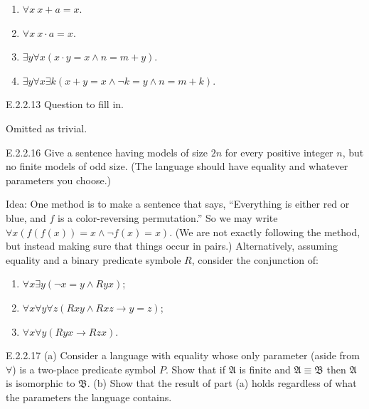 \begin{enumerate}
  \item $\forall x\ x+a=x$.
  \item $\forall x\ x\cdot a=x$.
  \item $\exists y\forall x(x\cdot y=x\wedge n=m+y)$.
  \item $\exists y\forall x\exists k(x+y=x\wedge \neg k=y\wedge n=m+k)$.
\end{enumerate}


\setcounter{exercise}{12}

\begin{exercise}{E.2.2.13}
  Question to fill in.
\end{exercise}

Omitted as trivial.

\setcounter{exercise}{15}

\begin{exercise}{E.2.2.16}
  Give a sentence having models of size $2n$ for every positive integer $n$, but no finite models of odd size. (The language should have equality and whatever parameters you choose.)
\end{exercise}

Idea: One method is to make a sentence that says, “Everything is either red or blue, and $f$ is a color-reversing permutation.” So we may write $\forall x(f(f(x))=x\wedge\neg f(x)=x)$. (We are not exactly following the method, but instead making sure that things occur in pairs.) Alternatively, assuming equality and a binary predicate symbole $R$, consider the conjunction of:
\begin{enumerate}[label=(\alph*)]
  \item $\forall x\exists y(\neg x=y\wedge Ryx)$;
  \item $\forall x\forall y\forall z(Rxy\wedge Rxz\to y=z)$;
  \item $\forall x\forall y(Ryx\to Rzx)$.
\end{enumerate}

\begin{exercise}{E.2.2.17}
  (a) Consider a language with equality whose only parameter (aside from $\forall$) is a two-place predicate symbol $P$. Show that if $\mathfrak{A}$ is finite and $\mathfrak{A}\equiv \mathfrak{B}$ then $\mathfrak{A}$ is isomorphic to $\mathfrak{B}$.
  (b) Show that the result of part (a) holds regardless of what the parameters the language contains.
\end{exercise}

